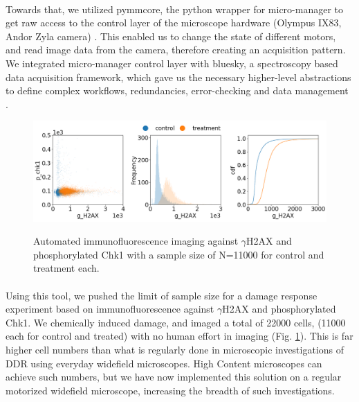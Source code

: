 \paragraph*{} Towards that, we utilized pymmcore, the python wrapper for micro-manager to get raw access to the control layer of the microscope hardware (Olympus IX83, Andor Zyla camera) \cite{edelstein2014advanced}. This enabled us to change the state of different motors, and read image data from the camera, therefore creating an acquisition pattern. We integrated micro-manager control layer with bluesky, a spectroscopy based data acquisition framework, which gave us the necessary higher-level abstractions to define complex workflows, redundancies, error-checking and data management \cite{allan2019bluesky}.

\begin{figure}[H]
    {\hfill\includegraphics[clip, width=1\linewidth]{figures/ncs.png}\hspace*{\fill}}
    \caption{Automated immunofluorescence imaging against $\gamma$H2AX and phosphorylated Chk1 with a sample size of N=11000 for control and treatment each.}
    {\label{fig:ncs}}
\end{figure}

\paragraph*{} Using this tool, we pushed the limit of sample size for a damage response experiment based on immunofluorescence against $\gamma$H2AX and phosphorylated Chk1. We chemically induced damage, and imaged a total of 22000 cells, (11000 each for control and treated) with no human effort in imaging (Fig. \ref{fig:ncs}). This is far higher cell numbers than what is regularly done in microscopic investigations of DDR using everyday widefield microscopes. High Content microscopes can achieve such numbers, but we have now implemented this solution on a regular motorized widefield microscope, increasing the breadth of such investigations.

